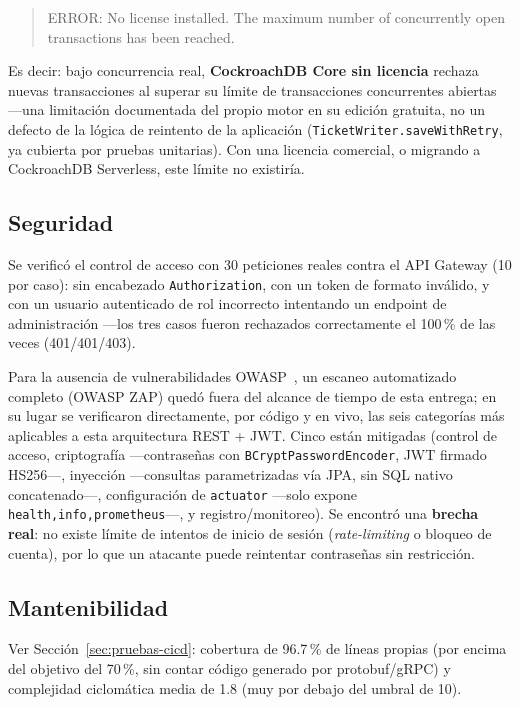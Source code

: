 \begin{quote}
\ttfamily\small ERROR: No license installed. The maximum number of concurrently open
transactions has been reached.
\end{quote}

Es decir: bajo concurrencia real, \textbf{CockroachDB Core sin licencia} rechaza nuevas
transacciones al superar su límite de transacciones concurrentes abiertas —una limitación
documentada del propio motor en su edición gratuita, no un defecto de la lógica de reintento de
la aplicación (\texttt{TicketWriter.saveWithRetry}, ya cubierta por pruebas unitarias). Con una
licencia comercial, o migrando a CockroachDB Serverless, este límite no existiría.

\subsection{Seguridad}

Se verificó el control de acceso con 30 peticiones reales contra el API Gateway (10 por caso): sin
encabezado \texttt{Authorization}, con un token de formato inválido, y con un usuario autenticado
de rol incorrecto intentando un endpoint de administración —los tres casos fueron rechazados
correctamente el 100\,\% de las veces (401/401/403).

Para la ausencia de vulnerabilidades OWASP~\cite{owasp2021top10}, un escaneo automatizado
completo (OWASP ZAP) quedó fuera del alcance de tiempo de esta entrega; en su lugar se
verificaron directamente, por código y en vivo, las seis categorías más aplicables a esta
arquitectura REST + JWT. Cinco están mitigadas (control de acceso, criptografía —contraseñas con
\texttt{BCryptPasswordEncoder}, JWT firmado HS256—, inyección —consultas parametrizadas vía JPA,
sin SQL nativo concatenado—, configuración de \texttt{actuator} —solo expone
\texttt{health,info,prometheus}—, y registro/monitoreo). Se encontró una \textbf{brecha real}: no
existe límite de intentos de inicio de sesión (\emph{rate-limiting} o bloqueo de cuenta), por lo
que un atacante puede reintentar contraseñas sin restricción.

\subsection{Mantenibilidad}

Ver Sección~\ref{sec:pruebas-cicd}: cobertura de 96.7\,\% de líneas propias (por encima del
objetivo del 70\,\%, sin contar código generado por protobuf/gRPC) y complejidad ciclomática
media de 1.8 (muy por debajo del umbral de 10).

